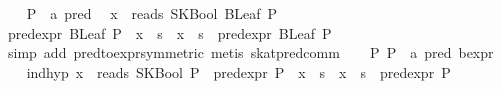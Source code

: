 \begin{isabellebody}
\ \ \isamarkupfalse%
\ P\ {}{}\ {}{}a\ pred{}\ \isamarkupfalse%
\ {}x\ {}\ reads\ {}SKBool\ {}BLeaf\ P{}{}{}\isanewline
\ \ \isamarkupfalse%
\ {}pred{}expr\ {}BLeaf\ P{}\ {}\ x\ {}{}\ s\ {}\ x\ {}{}\ s\ {}\ pred{}expr\ {}BLeaf\ P{}{}\isanewline
\ \ \ \ \isamarkupfalse%
\ {}simp\ add{}\ pred{}to{}expr{}symmetric{}{}\ metis\ skat{}pred{}comm{}\isanewline
{}\isamarkupfalse%
\isanewline
\ \ \isamarkupfalse%
\ P{}\ P{}\ {}{}\ {}{}a\ pred\ bexpr{}\isanewline
\ \ \isamarkupfalse%
\ ind{}hyp{}{}\ {}x\ {}\ reads\ {}SKBool\ P{}{}\ {}\ pred{}expr\ P{}\ {}\ x\ {}{}\ s\ {}\ x\ {}{}\ s\ {}\ pred{}expr\ P{}{}\isanewline

\end{isabellebody}
